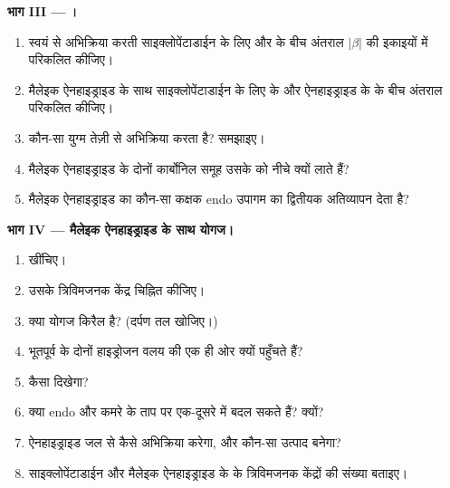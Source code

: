 \begin{problem}
\medskip
\noindent\textbf{भाग III --- ।}
\begin{enumerate}[resume]
  \item स्वयं से अभिक्रिया करती साइक्लोपेंटाडाईन के लिए  और  के बीच अंतराल
        $|\beta|$ की इकाइयों में परिकलित कीजिए।
  \item मैलेइक ऐनहाइड्राइड के साथ साइक्लोपेंटाडाईन के लिए  के
         और ऐनहाइड्राइड के  के बीच अंतराल परिकलित कीजिए।
  \item कौन-सा युग्म तेज़ी से अभिक्रिया करता है? समझाइए।
  \item मैलेइक ऐनहाइड्राइड के दोनों कार्बोनिल समूह उसके  को नीचे क्यों लाते हैं?
  \item मैलेइक ऐनहाइड्राइड का कौन-सा कक्षक endo उपागम का द्वितीयक अतिव्यापन
        देता है?
\end{enumerate}

\medskip
\noindent\textbf{भाग IV --- मैलेइक ऐनहाइड्राइड के साथ योगज।}
\begin{enumerate}[resume]
  \item {} खींचिए।
  \item उसके त्रिविमजनक केंद्र चिह्नित कीजिए।
  \item क्या योगज किरैल है? (दर्पण तल खोजिए।)
  \item भूतपूर्व  के दोनों हाइड्रोजन वलय की एक ही ओर क्यों
        पहुँचते हैं?
  \item {} कैसा दिखेगा?
  \item क्या endo और  कमरे के ताप पर एक-दूसरे में बदल सकते हैं? क्यों?
  \item ऐनहाइड्राइड जल से कैसे अभिक्रिया करेगा, और कौन-सा उत्पाद बनेगा?
  \item साइक्लोपेंटाडाईन और मैलेइक ऐनहाइड्राइड के  के त्रिविमजनक केंद्रों की
        संख्या बताइए।
\end{enumerate}
\end{problem}
